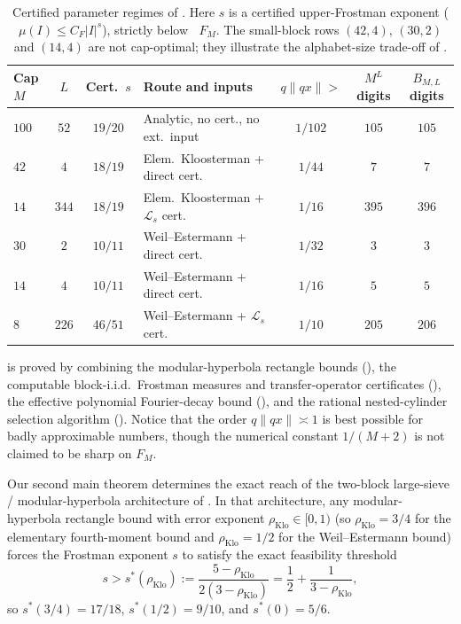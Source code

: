 \documentclass[11pt]{article}
\newcommand{\dist}[1]{\lVert #1\rVert}
\newcommand{\Lop}{\mathcal{L}}
\newcommand{\rhoK}{\rho_{\mathrm{Klo}}}
\DeclareMathOperator{\dimH}{\dim_{\mathrm{H}}}
\begin{document}
\begin{table}[ht]
\centering\small
\setlength{\tabcolsep}{4.5pt}
\begin{tabular}{@{}lcclccc@{}}
\toprule
Cap $M$ & $L$ & Cert.\ $s$ & Route and inputs & $q\dist{qx}>$ & $M^L$ digits & $B_{M,L}$ digits \\
\midrule
$100$ & $52$ & $19/20$ & Analytic, no cert., no ext.\ input & $1/102$ & $105$ & $105$ \\
$42$ & $4$ & $18/19$ & Elem.\ Kloosterman + direct cert. & $1/44$ & $7$ & $7$ \\
$14$ & $344$ & $18/19$ & Elem.\ Kloosterman + $\Lop_s$ cert. & $1/16$ & $395$ & $396$ \\
$30$ & $2$ & $10/11$ & Weil--Estermann + direct cert. & $1/32$ & $3$ & $3$ \\
$14$ & $4$ & $10/11$ & Weil--Estermann + direct cert. & $1/16$ & $5$ & $5$ \\
$8$ & $226$ & $46/51$ & Weil--Estermann + $\Lop_s$ cert. & $1/10$ & $205$ & $206$ \\
\bottomrule
\end{tabular}
\caption{Certified parameter regimes of . Here $s$ is a certified upper-Frostman exponent ($\mu(I)\le C_F|I|^s$), strictly below $\dimH F_M$. The small-block rows $(42,4)$, $(30,2)$ and $(14,4)$ are not cap-optimal; they illustrate the alphabet-size trade-off of .}\label{tab:regimes}
\end{table}

 is proved by combining the modular-hyperbola rectangle bounds (), the computable block-i.i.d.\ Frostman measures and transfer-operator certificates (), the effective polynomial Fourier-decay bound (), and the rational nested-cylinder selection algorithm (). Notice that the order $q\dist{qx}\asymp1$ is best possible for badly approximable numbers, though the numerical constant $1/(M+2)$ is not claimed to be sharp on $F_M$.

Our second main theorem determines the exact reach of the two-block large-sieve / modular-hyperbola architecture of . In that architecture, any modular-hyperbola rectangle bound with error exponent $\rhoK\in[0,1)$ (so $\rhoK=3/4$ for the elementary fourth-moment bound and $\rhoK=1/2$ for the Weil--Estermann bound) forces the Frostman exponent $s$ to satisfy the exact feasibility threshold
\begin{equation}\label{eq:sstar}
s>s^*(\rhoK):=\frac{5-\rhoK}{2(3-\rhoK)}=\frac12+\frac1{3-\rhoK},
\end{equation}
so $s^*(3/4)=17/18$, $s^*(1/2)=9/10$, and $s^*(0)=5/6$.
\end{document}
